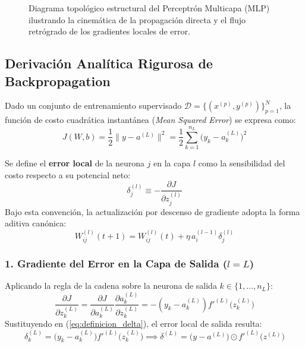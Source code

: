 \documentclass{article}
\begin{document}
\begin{figure}[H]
\caption{Diagrama topológico estructural del Perceptrón Multicapa (MLP) ilustrando la cinemática de la propagación directa y el flujo retrógrado de los gradientes locales de error.}
\label{fig:esquema_mlp_tikz}
\end{figure}

\subsection{Derivación Analítica Rigurosa de Backpropagation}

Dado un conjunto de entrenamiento supervisado $\mathcal{D} = \{(x^{(p)}, y^{(p)})\}_{p=1}^N$, la función de costo cuadrática instantánea (\textit{Mean Squared Error}) se expresa como:
\begin{equation}
    J(W, b) = \frac{1}{2} \|y - a^{(L)}\|^2 = \frac{1}{2} \sum_{k=1}^{n_L} \big(y_k - a_k^{(L)}\big)^2 \label{eq:costo_instantaneo}
\end{equation}

Se define el \textbf{error local} de la neurona $j$ en la capa $l$ como la sensibilidad del costo respecto a su potencial neto:
\begin{equation}
    \delta_j^{(l)} \equiv -\frac{\partial J}{\partial z_j^{(l)}} \label{eq:definicion_delta}
\end{equation}
Bajo esta convención, la actualización por descenso de gradiente adopta la forma aditiva canónica:
\begin{equation}
    W_{ij}^{(l)}(t+1) = W_{ij}^{(l)}(t) + \eta \, a_i^{(l-1)} \delta_j^{(l)}
\end{equation}

\subsubsection{1. Gradiente del Error en la Capa de Salida ($l = L$)}
Aplicando la regla de la cadena sobre la neurona de salida $k \in \{1, \dots, n_L\}$:
\begin{equation}
    \frac{\partial J}{\partial z_k^{(L)}} = \frac{\partial J}{\partial a_k^{(L)}} \frac{\partial a_k^{(L)}}{\partial z_k^{(L)}} = -(y_k - a_k^{(L)}) f'^{(L)}\big(z_k^{(L)}\big)
\end{equation}
Sustituyendo en (\ref{eq:definicion_delta}), el error local de salida resulta:
\begin{equation}
    \delta_k^{(L)} = \big(y_k - a_k^{(L)}\big) f'^{(L)}\big(z_k^{(L)}\big) \implies \delta^{(L)} = \big(y - a^{(L)}\big) \odot f'^{(L)}\big(z^{(L)}\big) \label{eq:delta_salida}
\end{equation}
\end{document}
